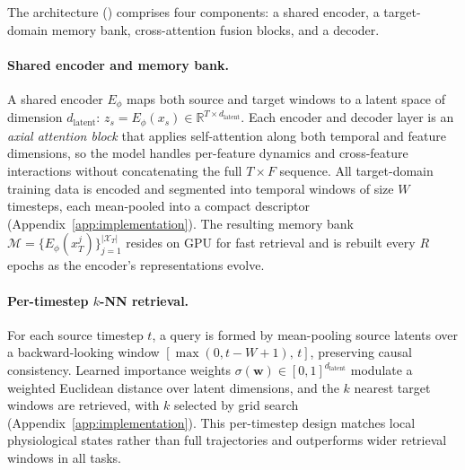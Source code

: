 The \retr{} architecture () comprises four components: a shared encoder, a target-domain memory bank, cross-attention fusion blocks, and a decoder.

\paragraph{Shared encoder and memory bank.}
A shared encoder $E_\phi$ maps both source and target windows to a latent space of dimension $d_{\text{latent}}$: $z_s = E_\phi(x_s) \in \mathbb{R}^{T \times d_{\text{latent}}}$.
Each encoder and decoder layer is an \emph{axial attention block} that applies self-attention along both temporal and feature dimensions, so the model handles per-feature dynamics and cross-feature interactions without concatenating the full $T \times F$ sequence.
All target-domain training data is encoded and segmented into temporal windows of size $W$ timesteps, each mean-pooled into a compact descriptor (Appendix~\ref{app:implementation}).
The resulting memory bank $\mathcal{M} = \{E_\phi(x_T^j)\}_{j=1}^{|\mathcal{X}_T|}$ resides on GPU for fast retrieval and is rebuilt every $R$ epochs as the encoder's representations evolve.

\paragraph{Per-timestep $k$-NN retrieval.}
For each source timestep $t$, a query is formed by mean-pooling source latents over a backward-looking window $[\max(0, t{-}W{+}1),\, t]$, preserving causal consistency.
Learned importance weights $\sigma(\mathbf{w}) \in [0,1]^{d_{\text{latent}}}$ modulate a weighted Euclidean distance over latent dimensions, and the $k$ nearest target windows are retrieved, with $k$ selected by grid search (Appendix~\ref{app:implementation}).
This per-timestep design matches local physiological states rather than full trajectories and outperforms wider retrieval windows in all tasks.


